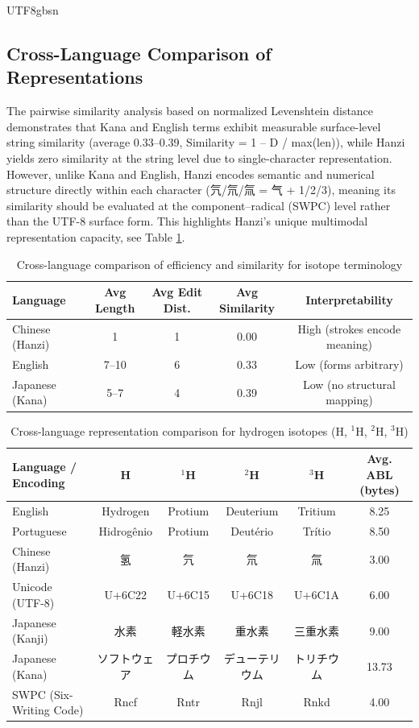 \documentclass[conference]{IEEEtran}
\begin{document}
\begin{CJK*}{UTF8}{gbsn}
\subsection{Cross-Language Comparison of Representations}
The pairwise similarity analysis based on normalized Levenshtein distance
demonstrates that Kana and English terms exhibit measurable surface-level
string similarity (average 0.33–0.39, Similarity = 1 – D / max(len)), while Hanzi yields zero similarity at the
string level due to single-character representation. However, unlike Kana and
English, Hanzi encodes semantic and numerical structure directly within each
character (氕/氘/氚 = 气 + 1/2/3), meaning its similarity should be evaluated
at the component–radical (SWPC) level rather than the UTF-8 surface form.
This highlights Hanzi's unique multimodal representation capacity, see Table \ref{tab:language_comparison}.

\begin{table}[h!]
\centering
\caption{Cross-language comparison of efficiency and similarity for isotope terminology}
\label{tab:language_comparison}
\begin{tabular}{|l|c|c|c|c|}
\hline
\textbf{Language} & \textbf{Avg Length} & \textbf{Avg Edit Dist.} & \textbf{Avg Similarity} & \textbf{Interpretability} \\
\hline
Chinese (Hanzi) & 1 & 1 & 0.00 & High (strokes encode meaning) \\
\hline
English & 7--10 & 6 & 0.33 & Low (forms arbitrary) \\
\hline
Japanese (Kana) & 5--7 & 4 & 0.39 & Low (no structural mapping) \\
\hline
\end{tabular}
\end{table}

\begin{table}[htbp]
\centering
\caption{Cross-language representation comparison for hydrogen isotopes (H, $^{1}$H, $^{2}$H, $^{3}$H)}
\label{tab:isotope_comparison}
\footnotesize
\renewcommand{\arraystretch}{1.2}
\begin{tabular}{|l|c|c|c|c|c|}
\hline
\toprule
\textbf{Language / Encoding} & \textbf{H} & \textbf{$^{1}$H} & \textbf{$^{2}$H} & \textbf{$^{3}$H} & \textbf{Avg. ABL (bytes)} \\
\midrule
English & Hydrogen & Protium & Deuterium & Tritium & 8.25 \\
\hline
Portuguese & Hidrogênio & Protium & Deutério & Trítio & 8.50 \\
\hline
Chinese (Hanzi) & 氢 & 氕 & 氘 & 氚 & 3.00 \\
\hline
Unicode (UTF-8) & U+6C22 & U+6C15 & U+6C18 & U+6C1A & 6.00 \\
\hline
Japanese (Kanji) & 水素 & 軽水素 & 重水素 & 三重水素 & 9.00 \\
\hline
Japanese (Kana) & ソフトウェア & プロチウム & デューテリウム & トリチウム & 13.73 \\
\hline
SWPC (Six-Writing Code) & Rncf & Rntr & Rnjl & Rnkd & 4.00 \\
\bottomrule
\hline
\end{tabular}
\end{table}




\end{CJK*}
\end{document}

